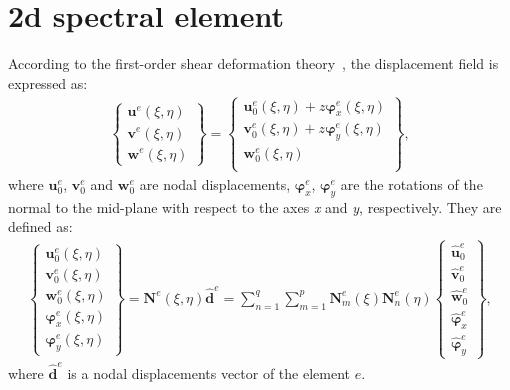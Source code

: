 \section{\acs{2d} spectral element}
\label{sec:2Dmodel}


According to the first-order shear deformation theory~\cite{reissner1945effect, mindlin1951influence}, the displacement field is expressed as:
\begin{eqnarray}
	\left \{ \begin{array}{c}
		\textbf{u}^e(\xi,\eta) \\
		\textbf{v}^e(\xi,\eta) \\
		\textbf{w}^e(\xi,\eta)
	\end{array} \right\} = 
	\left \{ \begin{array}{c}
		\textbf{u}_0^e(\xi,\eta) + z\boldsymbol{\varphi}_x^e(\xi,\eta)\\
		\textbf{v}_0^e(\xi,\eta) + z\boldsymbol{\varphi}_y^e(\xi,\eta)\\
		\textbf{w}_0^e(\xi,\eta) \\
	\end{array} \right\},
\end{eqnarray}
where \(\textbf{u}_0^e\), \(\textbf{v}_0^e\) and \(\textbf{w}_0^e\) are nodal displacements, \(\boldsymbol{\varphi}_x^e\), \(\boldsymbol{\varphi}_y^e\) are the rotations of the normal to the mid-plane with respect to the axes \textit{x} and \textit{y}, respectively. They are defined as:
\begin{eqnarray}
	\left \{\begin{array}{c}
		\textbf{u}_0^e(\xi,\eta) \\
		\textbf{v}_0^e(\xi,\eta) \\
		\textbf{w}_0^e(\xi,\eta) \\
		\boldsymbol{\varphi}_x^e(\xi,\eta) \\
		\boldsymbol{\varphi}_y^e(\xi,\eta)
	\end{array} \right\}
	= \textbf{N}^e(\xi,\eta)\widehat{\textbf{d}}^e
	= \sum_{n=1}^q\sum_{m=1}^p\textbf{N}_m^e(\xi)\textbf{N}_n^e(\eta)
	\left \{ \begin{array}{c}
		\widehat{\textbf{u}}_0^e \\
		\widehat{\textbf{v}}_0^e \\
		\widehat{\textbf{w}}_0^e \\
		\widehat{\boldsymbol{\varphi}}_x^e \\
		\widehat{\boldsymbol{\varphi}}_y^e
	\end{array} \right \},
\end{eqnarray}
where $\widehat{\textbf{d}}^e$ is a nodal displacements vector of the element $e$.

